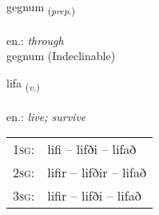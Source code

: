 \documentclass[frontgrid, backgrid]{flacards}\usepackage[]{graphicx}\usepackage[]{xcolor}
\begin{document}
\renewcommand{\blhead}{\vskip5pt {\small\bfseries\footnotesize Forsetning | Preposition }}
\renewcommand{\bcfoot}{\vskip5pt \hspace{2pt}{\small\bfseries\footnotesize 1K}}


{gegnum \small{\textsubscript{(\textit{prep.})}} \\[1ex]
\textphonetic{[cɛknʏm]} \\
en.: \emph{through} \\  [2ex]
gegnum (Indeclinable)}

\renewcommand{\flhead}{\vskip5pt \fboxsep=0pt {\small\bfseries\footnotesize Sagnorð | Verb}}
\renewcommand{\fcfoot}{\vskip5pt \fboxsep=0pt \hspace{2pt}{\small\bfseries\footnotesize 1K}}

\renewcommand{\blhead}{\vskip5pt {\small\bfseries\footnotesize Sagnorð | Verb }}
\renewcommand{\bcfoot}{\vskip5pt \hspace{2pt}{\small\bfseries\footnotesize 1K}}


{lifa \small{\textsubscript{(\textit{v.})}} \\[1ex] %
\textphonetic{[lɪːva]} \\
en.: \emph{live; survive} \\  [2ex]
\renewcommand*{\arraystretch}{0.8}
\begin{tabular}{p{1cm}l}
\textsc{1sg}: & lifi -- lifði -- lifað \\ 
\textsc{2sg}: & lifir -- lifðir -- lifað \\ 
\textsc{3sg}: & lifir -- lifði -- lifað \\ 
\end{tabular}
}

\renewcommand{\flhead}{\vskip5pt \fboxsep=0pt {\small\bfseries\footnotesize Atviksorð | Adverb}}
\renewcommand{\fcfoot}{\vskip5pt \fboxsep=0pt \hspace{2pt}{\small\bfseries\footnotesize 1K}}

\renewcommand{\blhead}{\vskip5pt {\small\bfseries\footnotesize Atviksorð | Adverb }}
\renewcommand{\bcfoot}{\vskip5pt \hspace{2pt}{\small\bfseries\footnotesize 1K}}
\end{document}
